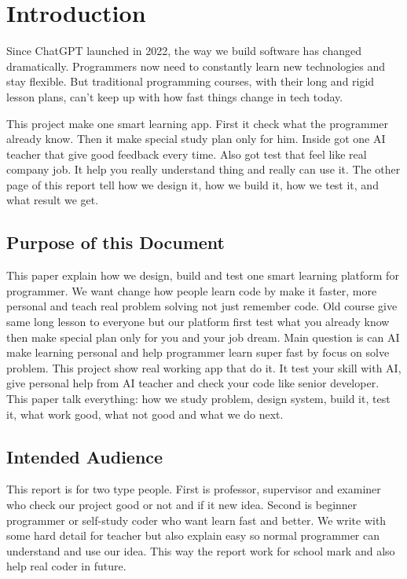 \documentclass{FastFyp}
\begin{document}
\chapter{Introduction}

Since ChatGPT launched in 2022, the way we build software has changed dramatically. Programmers now need to constantly learn new technologies and stay flexible. But traditional programming courses, with their long and rigid lesson plans, can't keep up with how fast things change in tech today.

This project make one smart learning app. First it check what the programmer already know. Then it make special study plan only for him. Inside got one AI teacher that give good feedback every time. Also got test that feel like real company job. It help you really understand thing and really can use it. The other page of this report tell how we design it, how we build it, how we test it, and what result we get.

\section{Purpose of this Document}

This paper explain how we design, build and test one smart learning platform for programmer. We want change how people learn code by make it faster, more personal and teach real problem solving not just remember code. Old course give same long lesson to everyone but our platform first test what you already know then make special plan only for you and your job dream. Main question is can AI make learning personal and help programmer learn super fast by focus on solve problem. This project show real working app that do it. It test your skill with AI, give personal help from AI teacher and check your code like senior developer. This paper talk everything: how we study problem, design system, build it, test it, what work good, what not good and what we do next.


\section{Intended Audience}

This report is for two type people. First is professor, supervisor and examiner who check our project good or not and if it new idea. Second is beginner programmer or self-study coder who want learn fast and better. We write with some hard detail for teacher but also explain easy so normal programmer can understand and use our idea. This way the report work for school mark and also help real coder in future.
\end{document}
